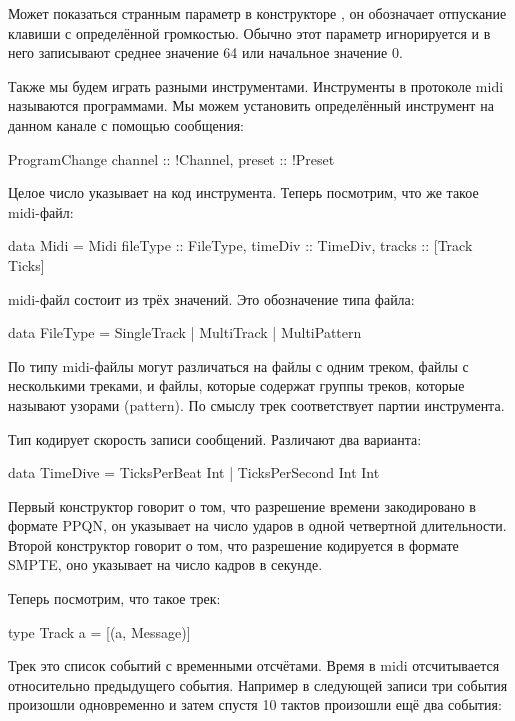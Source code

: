 Может показаться странным параметр  в конструкторе
, он обозначает отпускание клавиши с определённой
громкостью. Обычно этот параметр игнорируется и в него записывают
среднее значение 64 или начальное значение 0.

Также мы будем играть разными инструментами. Инструменты в протоколе
midi называются программами. Мы можем установить определённый инструмент
на данном канале с помощью сообщения:


\begin{code}
ProgramChange {
    channel :: !Channel,
    preset  :: !Preset }
\end{code}

Целое число  указывает на код инструмента. Теперь посмотрим,
что же такое midi-файл:


\begin{code}
data Midi = Midi {
    fileType :: FileType,
    timeDiv  :: TimeDiv,
    tracks   :: [Track Ticks] }
\end{code}

midi-файл состоит из трёх значений. Это обозначение типа файла:


\begin{code}
data FileType = SingleTrack | MultiTrack | MultiPattern
\end{code}

По типу midi-файлы могут различаться на файлы с одним треком, файлы с
несколькими треками, и файлы, которые содержат группы треков, которые
называют узорами (pattern). По смыслу трек соответствует партии
инструмента.

Тип  кодирует скорость записи сообщений. Различают два
варианта:


\begin{code}
data TimeDive = TicksPerBeat Int 
              | TicksPerSecond Int Int
\end{code}

Первый конструктор говорит о том, что разрешение времени закодировано в
формате PPQN, он указывает на число ударов в одной четвертной
длительности. Второй конструктор говорит о том, что разрешение
кодируется в формате SMPTE, оно указывает на число кадров в секунде.

Теперь посмотрим, что такое трек:


\begin{code}
type Track a = [(a, Message)]
\end{code}

Трек это список событий с временными отсчётами. Время в midi
отсчитывается относительно предыдущего события. Например в следующей
записи три события произошли одновременно и затем спустя 10 тактов
произошли ещё два события:


